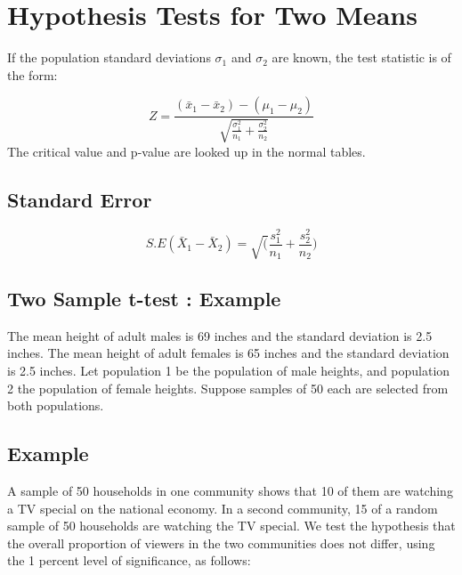 \documentclass[]{report}
\begin{document}
{


\section{Hypothesis Tests for Two Means}

If the population standard deviations $\sigma_1$ and $\sigma_2$
are known, the test statistic is of the form:

\begin{equation}
Z = \frac{(\bar{x}_1 - \bar{x}_2) - (\mu_1 - \mu_2 ) }{\sqrt{
\frac{\sigma^2_1}{n_1}+\frac{\sigma^2_2}{n_2}} }
\end{equation}
The critical value and p-value are looked up in the normal tables.




\subsection{Standard Error}

\begin{equation}
S.E(\bar{X}_{1}-\bar{X}_{2}) =
\sqrt(\frac{s^2_{1}}{n_{1}}+\frac{s^2_{2}}{n_{2}})
\end{equation}

\subsection{Two Sample t-test : Example}
The mean height of adult males is 69 inches and the standard
deviation is 2.5 inches. The mean height of adult females is 65
inches and the standard deviation is 2.5 inches. Let population 1
be the population of male heights, and population 2 the population
of female heights. Suppose samples of 50 each are selected from
both populations.









\subsection{Example} A sample of 50 households in one community
shows that 10 of them are watching a TV special on the national
economy. In a second community, 15 of a random sample of 50
households are watching the TV special. We test the hypothesis
that the overall proportion of viewers in the two communities does
not differ, using the 1 percent level of significance, as follows:

}
\end{document}
